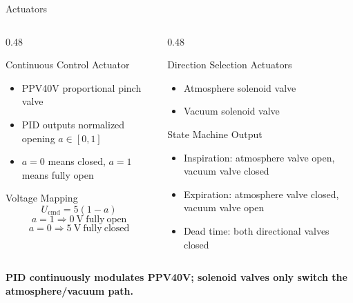 \documentclass[aspectratio=169,10pt]{beamer}
\newcommand{\highlight}[1]{\textcolor{lungblue}{\textbf{#1}}}
\begin{document}
\begin{frame}{Actuators}
  \begin{columns}[T,onlytextwidth]
    \begin{column}{0.48\textwidth}
      \begin{block}{Continuous Control Actuator}
        \begin{itemize}
          \item PPV40V proportional pinch valve
          \item PID outputs normalized opening $a\in[0,1]$
          \item $a=0$ means closed, $a=1$ means fully open
        \end{itemize}
      \end{block}

      \begin{block}{Voltage Mapping}
        \[
          U_{\mathrm{cmd}}=5(1-a)
        \]
        \[
          a=1 \Rightarrow 0\ \mathrm{V}\ \mathrm{fully\ open}
        \]
        \[
          a=0 \Rightarrow 5\ \mathrm{V}\ \mathrm{fully\ closed}
        \]
      \end{block}
    \end{column}
    \begin{column}{0.48\textwidth}
      \begin{block}{Direction Selection Actuators}
        \begin{itemize}
          \item Atmosphere solenoid valve
          \item Vacuum solenoid valve
        \end{itemize}
      \end{block}

      \begin{block}{State Machine Output}
        \begin{itemize}
          \item Inspiration: atmosphere valve open, vacuum valve closed
          \item Expiration: atmosphere valve closed, vacuum valve open
          \item Dead time: both directional valves closed
        \end{itemize}
      \end{block}
    \end{column}
  \end{columns}

  \vspace{0.2em}
  \centering
  \highlight{PID continuously modulates PPV40V; solenoid valves only switch the atmosphere/vacuum path.}
\end{frame}
\end{document}
